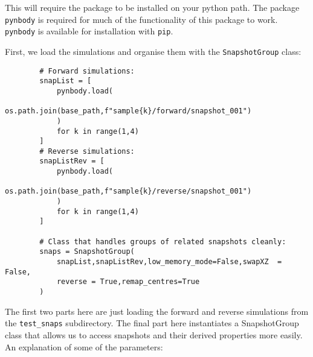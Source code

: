 \documentclass{article}
\newcommand{\codefont}[1]{{\texttt{#1}}}
\begin{document}
	This will require the package to be installed on your python path. The package \codefont{pynbody} is required for much of the functionality of this package to work. \codefont{pynbody} is available for installation with \codefont{pip}.
	
	First, we load the simulations and organise them with the \codefont{SnapshotGroup} class:
	\begin{verbatim}
		# Forward simulations:
		snapList = [
		    pynbody.load(
		        os.path.join(base_path,f"sample{k}/forward/snapshot_001")
		    )
		    for k in range(1,4)
		]
		# Reverse simulations:
		snapListRev = [
		    pynbody.load(
		        os.path.join(base_path,f"sample{k}/reverse/snapshot_001")
		    )
		    for k in range(1,4)
		]
		
		# Class that handles groups of related snapshots cleanly:
		snaps = SnapshotGroup(
		    snapList,snapListRev,low_memory_mode=False,swapXZ  = False,
		    reverse = True,remap_centres=True
		)
	\end{verbatim}
	The first two parts here are just loading the forward and reverse simulations from the \codefont{test\_snaps} subdirectory. The final part here instantiates a SnapshotGroup class that allows us to access snapshots and their derived properties more easily. An explanation of some of the parameters:
\end{document}
